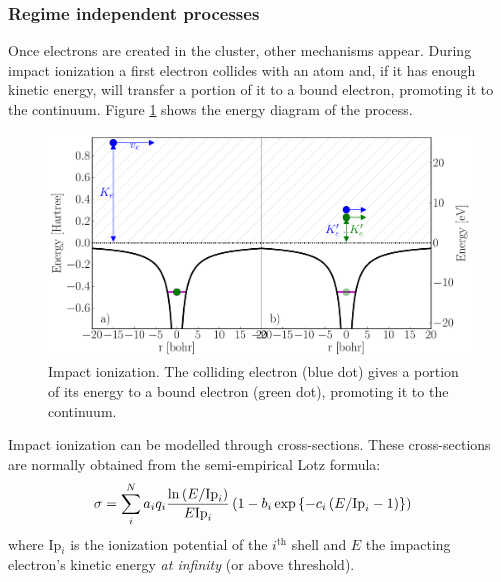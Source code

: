 
\subsubsection{Regime independent processes}
\label{section:intro:mechanisms:noregime}

Once electrons are created in the cluster, other mechanisms appear. During
impact ionization a first electron collides with an atom and, if it has enough
kinetic energy, will transfer a portion of it to a bound electron, promoting it
to the continuum. Figure \ref{fig:ionization:impact} shows the energy diagram
of the process.

\begin{figure}
 \centering
 \includegraphics[width=\figurewidth]{figures/ionization_impact}
 \caption{Impact ionization. The colliding electron (blue dot) gives a portion
          of its energy to a bound electron (green dot), promoting it to the
          continuum.}
 \label{fig:ionization:impact}
\end{figure}

Impact ionization can be modelled through cross-sections. These
cross-sections are normally obtained from the semi-empirical Lotz
formula\cite{Lotz1967}:
\begin{align}
\sigma & = \sum_{i}^{N} a_i q_i \frac{\ln{\left( E/\textrm{Ip}_i \right)}}{E \textrm{Ip}_i} \left( 1 - b_i
\exp{ \left\{ -c_i \left( E/\textrm{Ip}_i - 1 \right) \right\}} \right)
\label{eqn:impact:ionization:lotz}
\end{align}
where Ip$_i$ is the ionization potential of the $i^{\textrm{th}}$ shell and $E$
the impacting electron's kinetic energy \textit{at infinity} (or above threshold).

